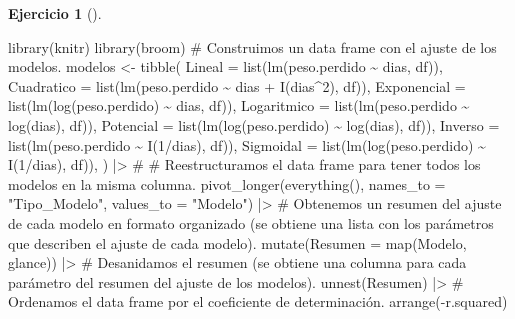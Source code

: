 \documentclass[
  a4paper,
]{scrreport}
\newenvironment{Shaded}{\begin{snugshade}}{\end{snugshade}}
\newcommand{\AttributeTok}[1]{\textcolor[rgb]{0.40,0.45,0.13}{#1}}
\newcommand{\CommentTok}[1]{\textcolor[rgb]{0.37,0.37,0.37}{#1}}
\newcommand{\DecValTok}[1]{\textcolor[rgb]{0.68,0.00,0.00}{#1}}
\newcommand{\FunctionTok}[1]{\textcolor[rgb]{0.28,0.35,0.67}{#1}}
\newcommand{\NormalTok}[1]{\textcolor[rgb]{0.00,0.23,0.31}{#1}}
\newcommand{\OtherTok}[1]{\textcolor[rgb]{0.00,0.23,0.31}{#1}}
\newcommand{\SpecialCharTok}[1]{\textcolor[rgb]{0.37,0.37,0.37}{#1}}
\newcommand{\StringTok}[1]{\textcolor[rgb]{0.13,0.47,0.30}{#1}}
\theoremstyle{definition}
\newtheorem{exercise}{Ejercicio}[chapter]
\theoremstyle{remark}
\begin{document}
\begin{exercise}[]
\begin{enumerate}
\begin{tcolorbox}
\begin{Shaded}
\begin{Highlighting}[]
\FunctionTok{library}\NormalTok{(knitr)}
\FunctionTok{library}\NormalTok{(broom)}
\CommentTok{\# Construimos un data frame con el ajuste de los modelos.}
\NormalTok{modelos }\OtherTok{\textless{}{-}} \FunctionTok{tibble}\NormalTok{(}
        \AttributeTok{Lineal =} \FunctionTok{list}\NormalTok{(}\FunctionTok{lm}\NormalTok{(peso.perdido }\SpecialCharTok{\textasciitilde{}}\NormalTok{ dias, df)),}
        \AttributeTok{Cuadratico =} \FunctionTok{list}\NormalTok{(}\FunctionTok{lm}\NormalTok{(peso.perdido }\SpecialCharTok{\textasciitilde{}}\NormalTok{ dias }\SpecialCharTok{+} \FunctionTok{I}\NormalTok{(dias}\SpecialCharTok{\^{}}\DecValTok{2}\NormalTok{), df)),}
        \AttributeTok{Exponencial =} \FunctionTok{list}\NormalTok{(}\FunctionTok{lm}\NormalTok{(}\FunctionTok{log}\NormalTok{(peso.perdido) }\SpecialCharTok{\textasciitilde{}}\NormalTok{ dias, df)),}
        \AttributeTok{Logaritmico =} \FunctionTok{list}\NormalTok{(}\FunctionTok{lm}\NormalTok{(peso.perdido }\SpecialCharTok{\textasciitilde{}} \FunctionTok{log}\NormalTok{(dias), df)),}
        \AttributeTok{Potencial =} \FunctionTok{list}\NormalTok{(}\FunctionTok{lm}\NormalTok{(}\FunctionTok{log}\NormalTok{(peso.perdido) }\SpecialCharTok{\textasciitilde{}} \FunctionTok{log}\NormalTok{(dias), df)),}
        \AttributeTok{Inverso =} \FunctionTok{list}\NormalTok{(}\FunctionTok{lm}\NormalTok{(peso.perdido }\SpecialCharTok{\textasciitilde{}} \FunctionTok{I}\NormalTok{(}\DecValTok{1}\SpecialCharTok{/}\NormalTok{dias), df)),}
        \AttributeTok{Sigmoidal =} \FunctionTok{list}\NormalTok{(}\FunctionTok{lm}\NormalTok{(}\FunctionTok{log}\NormalTok{(peso.perdido) }\SpecialCharTok{\textasciitilde{}} \FunctionTok{I}\NormalTok{(}\DecValTok{1}\SpecialCharTok{/}\NormalTok{dias), df)),}
\NormalTok{    )  }\SpecialCharTok{|\textgreater{}} 
    \CommentTok{\# }
    \CommentTok{\# Reestructuramos el data frame para tener todos los modelos en la misma columna.}
    \FunctionTok{pivot\_longer}\NormalTok{(}\FunctionTok{everything}\NormalTok{(), }\AttributeTok{names\_to =} \StringTok{"Tipo\_Modelo"}\NormalTok{, }\AttributeTok{values\_to =} \StringTok{"Modelo"}\NormalTok{)  }\SpecialCharTok{|\textgreater{}} 
    \CommentTok{\# Obtenemos un resumen del ajuste de cada modelo en formato organizado (se obtiene una lista con los parámetros que describen el ajuste de cada modelo).}
    \FunctionTok{mutate}\NormalTok{(}\AttributeTok{Resumen =} \FunctionTok{map}\NormalTok{(Modelo, glance)) }\SpecialCharTok{|\textgreater{}} 
    \CommentTok{\# Desanidamos el resumen (se obtiene una columna para cada parámetro del resumen del ajuste de los modelos).}
    \FunctionTok{unnest}\NormalTok{(Resumen)  }\SpecialCharTok{|\textgreater{}} 
    \CommentTok{\# Ordenamos el data frame por el coeficiente de determinación.}
    \FunctionTok{arrange}\NormalTok{(}\SpecialCharTok{{-}}\NormalTok{r.squared)}


\end{Highlighting}
\end{Shaded}
\end{tcolorbox}
\end{enumerate}
\end{exercise}
\end{document}
